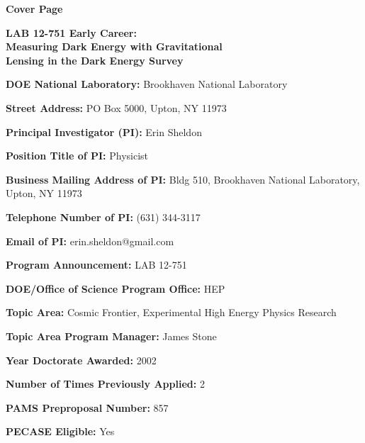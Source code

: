 \documentclass[12pt]{article}
\begin{document}

\begin{center}
 {\large {\bf Cover Page}}
\end{center}

\vspace{3mm}
\noindent
\begin{center}
{\bf LAB 12-751 Early Career:  \\ Measuring Dark Energy with Gravitational \\
Lensing in the Dark Energy Survey}
\end{center}

\vspace{3mm}
\noindent
{\bf DOE National Laboratory:} Brookhaven National Laboratory

\vspace{3mm}
\noindent
{\bf Street Address:} PO Box 5000, Upton, NY 11973

\vspace{3mm}
\noindent
{\bf Principal Investigator (PI):} Erin Sheldon

\vspace{3mm}
\noindent
{\bf Position Title of PI:} Physicist

\vspace{3mm}
\noindent
{\bf Business Mailing Address of PI:} Bldg 510, Brookhaven National Laboratory, Upton, NY
11973

\vspace{3mm}
\noindent
{\bf Telephone Number of PI:} (631) 344-3117

\vspace{3mm}
\noindent
{\bf Email of PI:} erin.sheldon@gmail.com

\noindent
{\bf Program Announcement: }LAB 12-751

\vspace{3mm}
\noindent
{\bf DOE/Office of Science Program Office:}  HEP

\vspace{3mm}
\noindent
{\bf Topic Area:} Cosmic Frontier, Experimental High Energy Physics Research

\vspace{3mm}
\noindent
{\bf Topic Area Program Manager:} James Stone

\vspace{3mm}
\noindent
{\bf Year Doctorate Awarded:}  2002


\vspace{3mm}
\noindent
{\bf Number of Times Previously Applied:} 2

\vspace{3mm}
\noindent
{\bf PAMS Preproposal Number:} 857


\vspace{3mm}
\noindent
{\bf PECASE Eligible:} Yes
\end{document}
